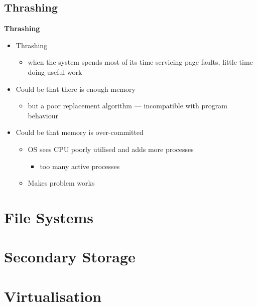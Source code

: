\documentclass[11pt,a4paper]{article}
\begin{document}
\subsection{Thrashing}

\textbf{Thrashing}
\begin{itemize}
    \item Thrashing
        \begin{itemize}
            \item when the system spends most of its time servicing page faults, little time
                doing useful work
        \end{itemize}
    \item Could be that there is enough memory
        \begin{itemize}
            \item but a poor replacement algorithm --- incompatible with program behaviour
        \end{itemize}
    \item Could be that memory is over-committed
        \begin{itemize}
            \item OS sees CPU poorly utilised and adds more processes
                \begin{itemize}
                    \item too many active processes
                \end{itemize}
            \item Makes problem works
        \end{itemize}
\end{itemize}

\section{File Systems}

\section{Secondary Storage}

\section{Virtualisation}
\end{document}
